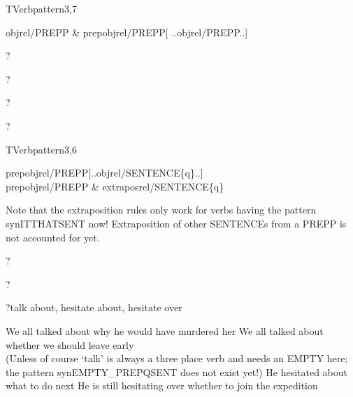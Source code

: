 \newpage
\verbpattern{[synPREPOTHERCLOSEDPREPPPROP]}
\begin{vpattern}
 TVerbpattern3,7
\csritem \mbox{}\\
     \begin{csr}
     objrel/PREPP & prepobjrel/PREPP[ ..objrel/PREPP..]
     \end{csr}
\remarksitem 
\end{vpattern}


\begin{thetadescr}
\evitem ?
\esitem
     \begin{examples}
        \example ?
     \end{examples}
\end{thetadescr}



\begin{thetadescr}
\evitem ?
\esitem
     \begin{examples}
        \example ?
     \end{examples}
\end{thetadescr}


\newpage
\verbpattern{[synPREPQSENT]}
\begin{vpattern}
 TVerbpattern3,6
\csritem \mbox{}\\
     \begin{csr}
      prepobjrel/PREPP[..objrel/SENTENCE\{q\}..]\\
      prepobjrel/PREPP & extraposrel/SENTENCE\{q\}
     \end{csr}
\remarksitem Note that the extraposition rules only work for verbs having the 
pattern synITTHATSENT now! Extraposition of other SENTENCEs from a PREPP is not 
accounted for yet.
\end{vpattern}


\begin{thetadescr}
\evitem ?
\esitem
     \begin{examples}
        \example  ?
     \end{examples}
\end{thetadescr}



\begin{thetadescr}
\evitem ?talk about, hesitate about, 
hesitate over
\esitem
     \begin{examples}
        \example We all talked about why he would have murdered her
        \example We all talked about whether we should leave early\\
        (Unless of course `talk' is always a three place verb and needs an 
         EMPTY here; the pattern synEMPTY\_PREPQSENT does not exist yet!)
        \example He hesitated about what to do next
        \example He is still hesitating over whether to join the expedition
     \end{examples}
\end{thetadescr}


